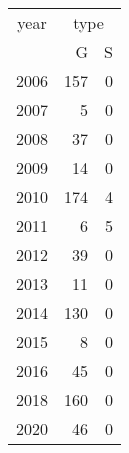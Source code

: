 \footnotesize\begin{tabular}[t]{lrr}
\toprule
\multicolumn{1}{c}{year} & \multicolumn{2}{c}{type} \\
\cmidrule(l{3pt}r{3pt}){1-1} \cmidrule(l{3pt}r{3pt}){2-3}
  & G & S\\
\midrule
2006 & 157 & 0\\
2007 & 5 & 0\\
2008 & 37 & 0\\
2009 & 14 & 0\\
2010 & 174 & 4\\
2011 & 6 & 5\\
2012 & 39 & 0\\
2013 & 11 & 0\\
2014 & 130 & 0\\
2015 & 8 & 0\\
2016 & 45 & 0\\
2018 & 160 & 0\\
2020 & 46 & 0\\
\bottomrule
\end{tabular}
